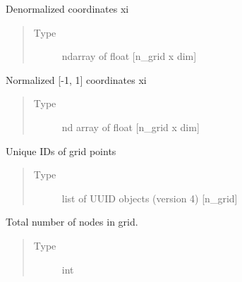 \documentclass[letterpaper,10pt,english,openany,oneside]{sphinxmanual}
\begin{document}
\begin{fulllineitems}
\begin{fulllineitems}
\label{\detokenize{pygpc:pygpc.Grid.Grid._coords}}
Denormalized coordinates xi
\begin{quote}\begin{description}
\item[{Type}] \leavevmode
ndarray of float {[}n\_grid x dim{]}

\end{description}\end{quote}

\end{fulllineitems}


\begin{fulllineitems}
\label{\detokenize{pygpc:pygpc.Grid.Grid._coords_norm}}
Normalized {[}-1, 1{]} coordinates xi
\begin{quote}\begin{description}
\item[{Type}] \leavevmode
nd array of float {[}n\_grid x dim{]}

\end{description}\end{quote}

\end{fulllineitems}


\begin{fulllineitems}
\label{\detokenize{pygpc:pygpc.Grid.Grid.coords_id}}
Unique IDs of grid points
\begin{quote}\begin{description}
\item[{Type}] \leavevmode
list of UUID objects (version 4) {[}n\_grid{]}

\end{description}\end{quote}

\end{fulllineitems}


\begin{fulllineitems}
\label{\detokenize{pygpc:pygpc.Grid.Grid.n_grid}}
Total number of nodes in grid.
\begin{quote}\begin{description}
\item[{Type}] \leavevmode
int


\end{description}
\end{quote}
\end{fulllineitems}
\end{fulllineitems}
\end{document}
